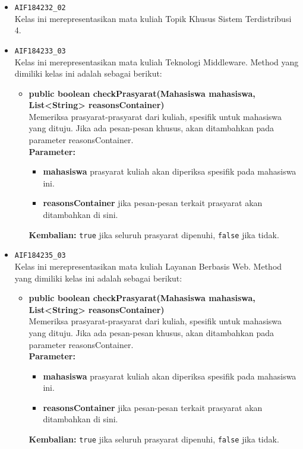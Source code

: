 \begin{enumerate}
\begin{itemize}
\begin{itemize}
		\end{itemize}
		\item \texttt{AIF184232\_02} \\
		Kelas ini merepresentasikan mata kuliah Topik Khusus Sistem Terdistribusi 4.
		\item \texttt{AIF184233\_03} \\
		Kelas ini merepresentasikan mata kuliah Teknologi Middleware. Method yang dimiliki kelas ini adalah sebagai berikut: 
		\begin{itemize}
			\item \textbf{public boolean checkPrasyarat(Mahasiswa mahasiswa, List<String> reasonsContainer)}\\
			Memeriksa prasyarat-prasyarat dari kuliah, spesifik untuk mahasiswa yang dituju. Jika ada pesan-pesan khusus, akan ditambahkan pada parameter reasonsContainer.\\
			\textbf{Parameter:}
			\begin{itemize}
				\item \textbf{mahasiswa} prasyarat kuliah akan diperiksa spesifik pada mahasiswa ini.
				\item \textbf{reasonsContainer} jika pesan-pesan terkait prasyarat akan ditambahkan di sini.
			\end{itemize}
			\textbf{Kembalian:} \texttt{true} jika seluruh prasyarat dipenuhi, \texttt{false} jika tidak.
		\end{itemize}
		\item \texttt{AIF184235\_03} \\
		Kelas ini merepresentasikan mata kuliah Layanan Berbasis Web. Method yang dimiliki kelas ini adalah sebagai berikut: 
		\begin{itemize}
			\item \textbf{public boolean checkPrasyarat(Mahasiswa mahasiswa, List<String> reasonsContainer)}\\
			Memeriksa prasyarat-prasyarat dari kuliah, spesifik untuk mahasiswa yang dituju. Jika ada pesan-pesan khusus, akan ditambahkan pada parameter reasonsContainer.\\
			\textbf{Parameter:}
			\begin{itemize}
				\item \textbf{mahasiswa} prasyarat kuliah akan diperiksa spesifik pada mahasiswa ini.
				\item \textbf{reasonsContainer} jika pesan-pesan terkait prasyarat akan ditambahkan di sini.
			\end{itemize}
			\textbf{Kembalian:} \texttt{true} jika seluruh prasyarat dipenuhi, \texttt{false} jika tidak.

\end{itemize}
\end{itemize}
\end{enumerate}
